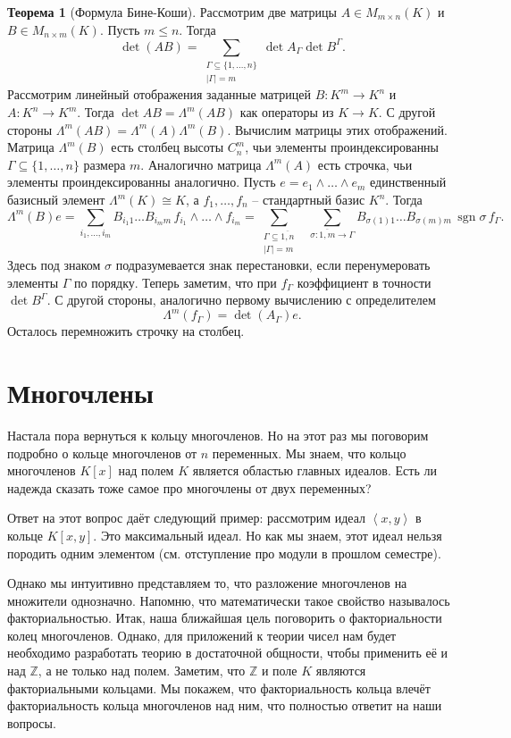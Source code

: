 \documentclass[10pt,a4paper,oneside]{book}
\theoremstyle{definition}
\newtheorem{thm}{{\color{red!40!black} Теорема}}
\newcommand{\mb}[1]{\mathbb{#1}}
\newcommand{\ovl}{\overline}
\newcommand{\sgn}{\operatorname{sgn}}
\def\lan{\left\langle }
\def\ran{\right\rangle}
\def\thrm{\begin{thm}}
\def\ethrm{\end{thm}}
\begin{document}
\thrm[Формула Бине-Коши] Рассмотрим две матрицы $A\in M_{m\times n}(K)$ и $B\in M_{n\times m}(K)$. Пусть $m\leq n$. Тогда
$$\det(AB)=\sum_{\substack{\Gamma \subseteq \{1,\dots,n\}\\ |\Gamma|=m}} \det A_{\Gamma} \det B^{\Gamma}.$$
\proof Рассмотрим линейный отображения заданные матрицей $B \colon K^m \to K^n$ и $A\colon K^n \to K^m$. Тогда $\det AB = \Lambda^m (AB)$ как операторы из $K \to K$. С другой стороны $\Lambda^m(AB)=\Lambda^m(A) \Lambda^m(B)$. Вычислим матрицы этих отображений. Матрица $\Lambda^m(B)$ есть столбец высоты $C_n^m$, чьи элементы проиндексированны $\Gamma \subseteq \{1,\dots,n\}$ размера $m$. Аналогично матрица $\Lambda^m(A)$  есть строчка, чьи элементы проиндексированны аналогично.
Пусть $e=e_1\wedge \dots \wedge e_m$ единственный базисный элемент $\Lambda^m(K)\cong K$, а $f_1,\dots,f_n$ -- стандартный базис $K^n$. Тогда 
$$\Lambda^m(B)e= \sum_{i_1,\dots,i_m} B_{i_1 1}\dots B_{i_m m} \,f_{i_1}\wedge \dots \wedge f_{i_m}=\sum_{\substack{\Gamma \subseteq \ovl{1,n} \\ |\Gamma|=m}}\,\,\,\, \sum_{\sigma\colon \ovl{1,m} \to \Gamma} B_{\sigma(1)1}\dots B_{\sigma(m)m}\,\sgn{\sigma}\,f_{\Gamma}.$$
Здесь под знаком $\sigma$ подразумевается знак перестановки, если перенумеровать элементы $\Gamma$ по порядку. Теперь заметим, что при $f_{\Gamma}$ коэффициент в точности $\det B^{\Gamma}$. С другой стороны, аналогично первому вычислению с определителем
$$\Lambda^m(f_{\Gamma})=\det(A_{\Gamma})e.$$
Осталось перемножить строчку на столбец.
\endproof
\ethrm







\chapter{Многочлены}
Настала пора вернуться к кольцу многочленов. Но на этот раз мы поговорим подробно о кольце многочленов от $n$ переменных. Мы знаем, что кольцо многочленов $K[x]$ над полем $K$ является областью главных идеалов. Есть ли надежда сказать тоже самое про многочлены от двух переменных? 

Ответ на этот вопрос даёт следующий пример: рассмотрим идеал $\lan x,y \ran$ в кольце $K[x,y]$. Это максимальный идеал. Но как мы знаем, этот идеал нельзя породить одним элементом (см. отступление про модули в прошлом семестре). 

Однако мы интуитивно представляем то, что разложение многочленов на множители однозначно. Напомню, что математически такое свойство называлось факториальностью. Итак, наша ближайшая цель поговорить о факториальности колец многочленов. Однако, для приложений к теории чисел нам будет необходимо разработать теорию в достаточной общности, чтобы применить её и над $\mb Z$, а не только над полем. Заметим, что $\mb Z$ и поле $K$ являются факториальными кольцами. Мы покажем, что факториальность кольца влечёт факториальность кольца многочленов над ним, что полностью ответит на наши вопросы.
\end{document}
